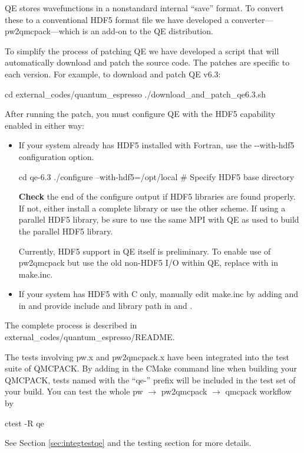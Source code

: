 QE stores wavefunctions in a nonstandard internal
``save'' format. To convert these to a conventional HDF5 format file
we have developed a converter---pw2qmcpack---which is an add-on to the
QE distribution.

To simplify the process of patching QE we have developed
a script that will automatically download and patch the source
code. The patches are specific to each version. For example, to download and
patch QE v6.3:

\begin{shade}
cd external_codes/quantum_espresso
./download_and_patch_qe6.3.sh
\end{shade}
After running the patch, you must configure QE with
the HDF5 capability enabled in either way:
\begin{itemize}
\item If your system already has HDF5 installed with Fortran, use the -{}-with-hdf5 configuration option.

\begin{shade}
cd qe-6.3
./configure --with-hdf5=/opt/local   # Specify HDF5 base directory
\end{shade}
   {\bf Check} the end of the configure output if HDF5 libraries are found properly.
   If not, either install a complete library or use the other scheme. If using a parallel HDF5 library, be sure to use
   the same MPI with QE as used to build the parallel HDF5 library.

   Currently, HDF5 support in QE itself is preliminary. To enable use of pw2qmcpack
   but use the old non-HDF5 I/O within QE, replace  with  in make.inc.
\item If your system has HDF5 with C only, manually edit make.inc by adding  and 
   in  and provide include and library path in  and .
\end{itemize}

The complete process is described in external\_codes/quantum\_espresso/README.

The tests involving pw.x and pw2qmcpack.x have been integrated into the test suite of QMCPACK.
By adding  in the CMake command line when building your QMCPACK,
tests named with the ``qe-'' prefix will be included in the test set of your build.
You can test the whole pw $\to$ pw2qmcpack $\to$ qmcpack workflow by

\begin{shade}
ctest -R qe
\end{shade}
See Section \ref{sec:integtestqe} and the testing section for more details.

